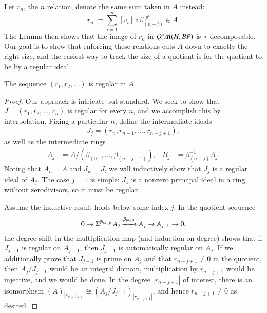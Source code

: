Let $r_n$, the $n${\th} relation, denote the same sum taken in $A$ instead: \[r_n := \sum_{i=1}^n [v_i] \circ \beta_{(n-i)}^{\circ p^i} \in A.\]  The Lemma then shows that the image of $r_n$ in $Q^* \AA(H, BP)$ is $\circ$--decomposable.  Our goal is to show that enforcing these relations cuts $A$ down to exactly the right size, and the easiest way to track the size of a quotient is for the quotient to be by a regular ideal.

\begin{lemma}
The sequence $(r_1, r_2, \ldots)$ is regular in $A$.
\end{lemma}
\begin{proof}
Our approach is intricate but standard.  We seek to show that $J = (r_1, r_2, \ldots, r_n)$ is regular for every $n$, and we accomplish this by interpolation.  Fixing a particular $n$, define the intermediate ideals \[J_j = (r_n, r_{n-1}, \ldots, r_{n-j+1}),\] as well as the intermediate rings
\begin{align*}
A_j & = A / (\beta_{(0)}, \ldots, \beta_{(n-j-1)}), &
B_j & = \beta_{(n-j)}^{-1} A_j.
\end{align*}
Noting that $A_n = A$ and $J_n = J$, we will inductively show that $J_j$ is a regular ideal of $A_j$.  The case $j = 1$ is simple: $J_1$ is a nonzero principal ideal in a ring without zerodivisors, so it must be regular.

Assume the inductive result holds below some index $j$.  In the quotient sequence \[0 \to \Susp^{|\beta_{(n-j)}|} A_j \xrightarrow{\beta_{(n-j)}} A_j \to A_{j-1} \to 0,\] the degree shift in the multiplication map (and induction on degree) shows that if $J_{j-1}$ is regular on $A_{j-1}$, then $J_{j-1}$ is automatically regular on $A_j$.  If we additionally prove that $J_{j-1}$ is prime on $A_j$ and that $r_{n-j+1} \ne 0$ in the quotient, then $A_j / J_{j-1}$ would be an integral domain, multiplication by $r_{n-j+1}$ would be injective, and we would be done.  In the degree $|r_{n-j+1}|$ of interest, there is an isomorphism $(A)_{|r_{n-j+1}|} \cong (A_j / J_{j-1})_{|r_{n-j+1}|}$, and hence $r_{n-j+1} \ne 0$ as desired.


\end{proof}
